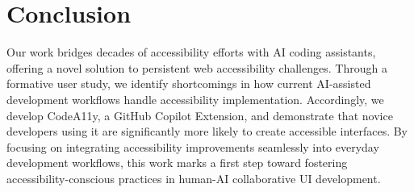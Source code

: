 \section{Conclusion}
\label{conc}
Our work bridges decades of accessibility efforts with AI coding assistants, offering a novel solution to persistent web accessibility challenges. 
Through a formative user study, we identify shortcomings in how current AI-assisted development workflows handle accessibility implementation. Accordingly, we develop CodeA11y, a GitHub Copilot Extension, and demonstrate that novice developers using it are significantly more likely to create accessible interfaces. By focusing on integrating accessibility improvements seamlessly into everyday development workflows, this work marks a first step toward fostering accessibility-conscious practices in human-AI collaborative UI development.
